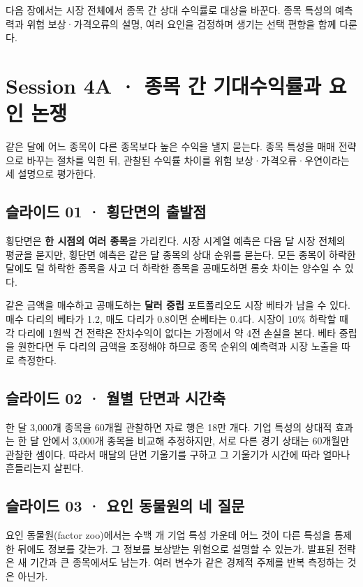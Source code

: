 \documentclass[11pt,a4paper]{article}
\begin{document}
다음 장에서는 시장 전체에서 종목 간 상대 수익률로 대상을 바꾼다. 종목 특성의 예측력과 위험 보상·가격오류의 설명, 여러 요인을 검정하며 생기는 선택 편향을 함께 다룬다.\par

\section{Session 4A · 종목 간 기대수익률과 요인 논쟁}
같은 달에 어느 종목이 다른 종목보다 높은 수익을 낼지 묻는다. 종목 특성을 매매 전략으로 바꾸는 절차를 익힌 뒤, 관찰된 수익률 차이를 위험 보상·가격오류·우연이라는 세 설명으로 평가한다.\par

\subsection{슬라이드 01 · 횡단면의 출발점}
횡단면은 \textbf{한 시점의 여러 종목}을 가리킨다. 시장 시계열 예측은 다음 달 시장 전체의 평균을 묻지만, 횡단면 예측은 같은 달 종목의 상대 순위를 묻는다. 모든 종목이 하락한 달에도 덜 하락한 종목을 사고 더 하락한 종목을 공매도하면 롱숏 차이는 양수일 수 있다.\par

같은 금액을 매수하고 공매도하는 \textbf{달러 중립} 포트폴리오도 시장 베타가 남을 수 있다. 매수 다리의 베타가 1.2, 매도 다리가 0.8이면 순베타는 0.4다. 시장이 10\% 하락할 때 각 다리에 1원씩 건 전략은 잔차수익이 없다는 가정에서 약 4전 손실을 본다. 베타 중립을 원한다면 두 다리의 금액을 조정해야 하므로 종목 순위의 예측력과 시장 노출을 따로 측정한다.\par

\subsection{슬라이드 02 · 월별 단면과 시간축}
한 달 3,000개 종목을 60개월 관찰하면 자료 행은 18만 개다. 기업 특성의 상대적 효과는 한 달 안에서 3,000개 종목을 비교해 추정하지만, 서로 다른 경기 상태는 60개월만 관찰한 셈이다. 따라서 매달의 단면 기울기를 구하고 그 기울기가 시간에 따라 얼마나 흔들리는지 살핀다.\par

\subsection{슬라이드 03 · 요인 동물원의 네 질문}
요인 동물원(factor zoo)에서는 수백 개 기업 특성 가운데 어느 것이 다른 특성을 통제한 뒤에도 정보를 갖는가. 그 정보를 보상받는 위험으로 설명할 수 있는가. 발표된 전략은 새 기간과 큰 종목에서도 남는가. 여러 변수가 같은 경제적 주제를 반복 측정하는 것은 아닌가.\par
\end{document}
